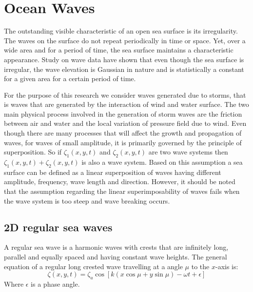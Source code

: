 \section{Ocean Waves} 

The outstanding visible characteristic of an open sea surface is its 
irregularity. The waves on the surface do not repeat periodically in time or 
space. Yet, over a wide area and for a period of time, the sea surface maintains
a characteristic appearance. Study on wave data have shown that even though the
sea surface is irregular, the wave elevation is Gaussian in nature and is 
statistically a constant for a given area for a certain period of time. 

For the purpose of this research we consider waves generated due to storms, that
is waves that are generated by the interaction of wind and water surface. The
two main physical process involved in the generation of storm waves are the
friction between air and water and the local variation of pressure field due to
wind. Even though there are many processes that will affect the growth and
propagation of waves, for waves of small amplitude, it is primarily governed by
the principle of superposition. So if $\zeta_1(x,y,t)$ and $\zeta_2(x,y,t)$ are
two wave systems then $\zeta_1(x,y,t) + \zeta_2(x,y,t)$ is also a wave system.
Based on this assumption a sea surface can be defined as a linear superposition
of waves having different amplitude, frequency, wave length and direction. 
However, it should be noted that the assumption regarding the linear 
superimposability of waves fails when the wave system is too steep and wave 
breaking occurs.

\subsection{2D regular sea waves}

A regular sea wave is a harmonic waves with crests that are infinitely long,
parallel and equally spaced and having constant wave heights. The general 
equation of a regular long crested wave travelling at a angle $\mu$ to the 
$x$-axis is:
\begin{equation}
  \zeta (x,y,t) = \zeta_a \cos[k(x \cos \mu + y \sin \mu) - \omega t + \epsilon]
  \label {eq: 2D wave equation}
\end{equation}
Where $\epsilon$ is a phase angle. 

